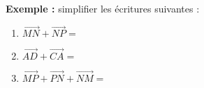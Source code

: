 \documentclass[11pt,a4paper]{article}
\begin{document}

\newpage

~~\vspace{-1cm}

\textbf{Exemple : } simplifier les écritures suivantes :

\begin{enumerate}
\item $\overrightarrow{MN} + \overrightarrow{NP} = $ \dotfill

\medskip

\item $\overrightarrow{AD} + \overrightarrow{CA} = $ \dotfill

\medskip

\item $\overrightarrow{MP} + \overrightarrow{PN} + \overrightarrow{NM} = $ \dotfill
\end{enumerate} 

\medskip
\end{document}
